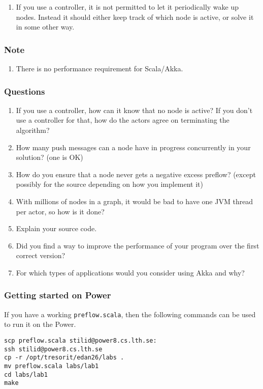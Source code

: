 \documentclass{forsete}
\begin{document}
{\begin{enumerate}
The reason is that the default way of thinking with actors should be ''send a message and wait for any message'', i.e. with !

(Motivation: without forbidding ? between nodes, it is ''too easy'' to use messages as normal method/function calls (but that limits concurrency normally).
If you think of a chat server when it sends a text to many phones, it would be too slow to send one at a time with ?
)

\item If you use a controller, it is not permitted to let it periodically wake up nodes. Instead it should either keep 
track of which node is active, or solve it in some other way.
\end{enumerate}

\subsubsection*{Note}
\begin{enumerate}
\item There is no performance requirement for Scala/Akka.
\end{enumerate}

\subsubsection*{Questions}
\begin{enumerate}
\item If you use a controller, how can it know that no node is active? If you don't use a controller for that, how do the actors agree on
terminating the algorithm?
\item How many push messages can a node have in progress concurrently in your solution? (one is OK)
\item How do you ensure that a node never gets a negative excess preflow? (except possibly for the source depending on how you implement it)
\item With millions of nodes in a graph, it would be bad to have one JVM thread per actor, so how is it done?
\item Explain your source code.
\item Did you find a way to improve the performance of your program over the first correct version?
\item For which types of applications would you consider using Akka and why?
\end{enumerate}

\subsubsection*{Getting started on Power}
If you have a working \verb!preflow.scala!, then the following commands can be used to run it on the Power.
\begin{verbatim}
scp preflow.scala stilid@power8.cs.lth.se:
ssh stilid@power8.cs.lth.se
cp -r /opt/tresorit/edan26/labs .
mv preflow.scala labs/lab1
cd labs/lab1
make
\end{verbatim}

}
\end{document}
